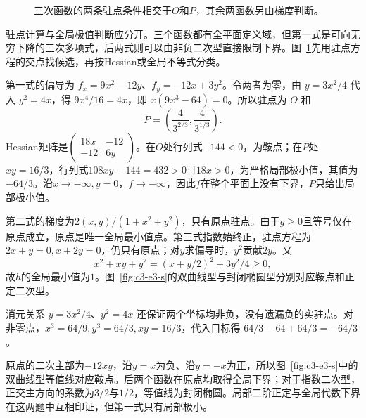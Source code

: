\begin{figure}[H]\centering
{}
\caption{三次函数的两条驻点条件相交于$O$和$P$，其余两函数另由梯度判断。}\label{fig:c3-e3-q}
\end{figure}
\begin{solution}
驻点计算与全局极值判断应分开。三个函数都有全平面定义域，但第一式是可向无穷下降的三次多项式，后两式则可以由非负二次型直接限制下界。图~\ref{fig:c3-e3-q}先用驻点方程的交点找候选，再按Hessian或全局不等式分类。


第一式的偏导为 $f_x=9x^2-12y$、$f_y=-12x+3y^2$。令两者为零，由 $y=3x^2/4$ 代入 $y^2=4x$，得 $9x^4/16=4x$，即 $x(9x^3-64)=0$。所以驻点为 $O$ 和
\[P=\left(\frac4{3^{2/3}},\frac4{3^{1/3}}\right).\]
Hessian矩阵是$\begin{pmatrix}18x&-12\\-12&6y\end{pmatrix}$。在$O$处行列式$-144<0$，为鞍点；在$P$处$xy=16/3$，行列式$108xy-144=432>0$且$18x>0$，为严格局部极小值，其值为$-64/3$。沿$x\to-\infty,y=0$，$f\to-\infty$，因此$f$在整个平面上没有下界，$P$只给出局部极小值。

第二式的梯度为$2(x,y)/(1+x^2+y^2)$，只有原点驻点。由于$g\ge0$且等号仅在原点成立，原点是唯一全局最小值点。第三式指数始终正，驻点方程为$2x+y=0,x+2y=0$，仍只有原点；对$y$求偏导时，$y^2$贡献$2y$。又
\[x^2+xy+y^2=(x+y/2)^2+3y^2/4\ge0,\]
故$h$的全局最小值为$1$。图~\ref{fig:c3-e3-s}的双曲线型与封闭椭圆型分别对应鞍点和正定二次型。


消元关系 $y=3x^2/4$、$y^2=4x$ 还保证两个坐标均非负，没有遗漏负的实驻点。对非零点，$x^3=64/9,y^3=64/3,xy=16/3$，代入目标得 $64/3-64+64/3=-64/3$。

原点的二次主部为$-12xy$，沿$y=x$为负、沿$y=-x$为正，所以图~\ref{fig:c3-e3-s}中的双曲线型等值线对应鞍点。后两个函数在原点均取得全局下界；对于指数二次型，正交主方向的系数为$3/2$与$1/2$，等值线为封闭椭圆。局部二阶正定与全局代数下界在这两题中互相印证，但第一式只有局部极小。


\end{solution}
